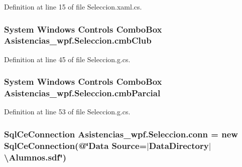 Definition at line 15 of file Seleccion.\-xaml.\-cs.

\hypertarget{class_asistencias__wpf_1_1_seleccion_adac0d1aa55be26c4cff9a610ee20b9c5}{
\subsubsection[{cmb\-Club}]{\setlength{\rightskip}{0pt plus 5cm}System Windows Controls Combo\-Box Asistencias\-\_\-wpf.\-Seleccion.\-cmb\-Club\hspace{0.3cm}{\ttfamily [package]}}}\label{class_asistencias__wpf_1_1_seleccion_adac0d1aa55be26c4cff9a610ee20b9c5}


Definition at line 45 of file Seleccion.\-g.\-cs.

\hypertarget{class_asistencias__wpf_1_1_seleccion_a24db3199864aca68b55959ae7477bb3b}{
\subsubsection[{cmb\-Parcial}]{\setlength{\rightskip}{0pt plus 5cm}System Windows Controls Combo\-Box Asistencias\-\_\-wpf.\-Seleccion.\-cmb\-Parcial\hspace{0.3cm}{\ttfamily [package]}}}\label{class_asistencias__wpf_1_1_seleccion_a24db3199864aca68b55959ae7477bb3b}


Definition at line 53 of file Seleccion.\-g.\-cs.

\hypertarget{class_asistencias__wpf_1_1_seleccion_abc8dc6733d50dc047da06e22ec543633}{
\subsubsection[{conn}]{\setlength{\rightskip}{0pt plus 5cm}Sql\-Ce\-Connection Asistencias\-\_\-wpf.\-Seleccion.\-conn = new Sql\-Ce\-Connection(@\char`\"{}Data Source=$|$Data\-Directory$|$\textbackslash{}Alumnos.\-sdf\char`\"{})\hspace{0.3cm}{\ttfamily [private]}}}\label{class_asistencias__wpf_1_1_seleccion_abc8dc6733d50dc047da06e22ec543633}


